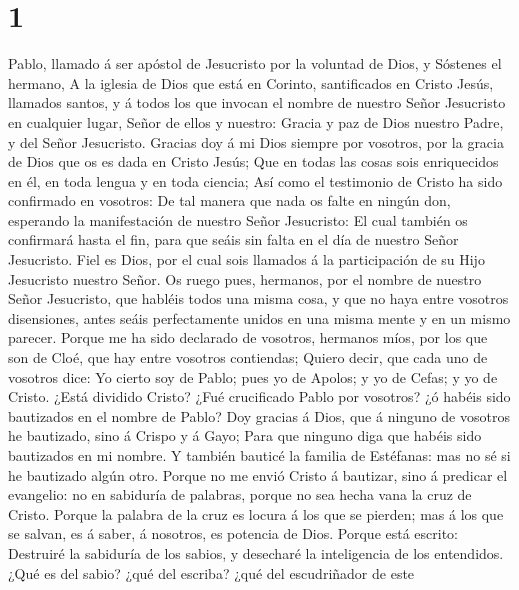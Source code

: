 \hypertarget{section}{%
\section{1}\label{section}}

 Pablo, llamado á ser apóstol de Jesucristo por la voluntad
de Dios, y Sóstenes el hermano,  A la iglesia de Dios que
está en Corinto, santificados en Cristo Jesús, llamados santos, y á
todos los que invocan el nombre de nuestro Señor Jesucristo en cualquier
lugar, Señor de ellos y nuestro:  Gracia y paz de Dios
nuestro Padre, y del Señor Jesucristo.  Gracias doy á mi
Dios siempre por vosotros, por la gracia de Dios que os es dada en
Cristo Jesús;  Que en todas las cosas sois enriquecidos en
él, en toda lengua y en toda ciencia;  Así como el
testimonio de Cristo ha sido confirmado en vosotros:  De tal
manera que nada os falte en ningún don, esperando la manifestación de
nuestro Señor Jesucristo:  El cual también os confirmará
hasta el fin, para que seáis sin falta en el día de nuestro Señor
Jesucristo.  Fiel es Dios, por el cual sois llamados á la
participación de su Hijo Jesucristo nuestro Señor.  Os
ruego pues, hermanos, por el nombre de nuestro Señor Jesucristo, que
habléis todos una misma cosa, y que no haya entre vosotros disensiones,
antes seáis perfectamente unidos en una misma mente y en un mismo
parecer.  Porque me ha sido declarado de vosotros, hermanos
míos, por los que son de Cloé, que hay entre vosotros contiendas;
 Quiero decir, que cada uno de vosotros dice: Yo cierto soy
de Pablo; pues yo de Apolos; y yo de Cefas; y yo de Cristo.
 ¿Está dividido Cristo? ¿Fué crucificado Pablo por
vosotros? ¿ó habéis sido bautizados en el nombre de Pablo? 
Doy gracias á Dios, que á ninguno de vosotros he bautizado, sino á
Crispo y á Gayo;  Para que ninguno diga que habéis sido
bautizados en mi nombre.  Y también bauticé la familia de
Estéfanas: mas no sé si he bautizado algún otro.  Porque no
me envió Cristo á bautizar, sino á predicar el evangelio: no en
sabiduría de palabras, porque no sea hecha vana la cruz de Cristo.
 Porque la palabra de la cruz es locura á los que se
pierden; mas á los que se salvan, es á saber, á nosotros, es potencia de
Dios.  Porque está escrito: Destruiré la sabiduría de los
sabios, y desecharé la inteligencia de los entendidos. 
¿Qué es del sabio? ¿qué del escriba? ¿qué del escudriñador de este

